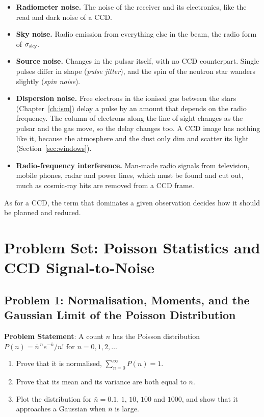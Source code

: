 \begin{itemize}
	\item \textbf{Radiometer noise.} The noise of the receiver and its electronics, like the read and dark noise of a CCD.
	\item \textbf{Sky noise.} Radio emission from everything else in the beam, the radio form of $\sigma_{\rm sky}$.
	\item \textbf{Source noise.} Changes in the pulsar itself, with no CCD counterpart. Single pulses differ in shape (\emph{pulse jitter}), and the spin of the neutron star wanders slightly (\emph{spin noise}).
	\item \textbf{Dispersion noise.} Free electrons in the ionised gas between the stars (Chapter~\ref{ch:ism}) delay a pulse by an amount that depends on the radio frequency. The column of electrons along the line of sight changes as the pulsar and the gas move, so the delay changes too. A CCD image has nothing like it, because the atmosphere and the dust only dim and scatter its light (Section~\ref{sec:windows}).
	\item \textbf{Radio-frequency interference.} Man-made radio signals from television, mobile phones, radar and power lines, which must be found and cut out, much as cosmic-ray hits are removed from a CCD frame.
\end{itemize}
As for a CCD, the term that dominates a given observation decides how it should be planned and reduced.

\section{Problem Set: Poisson Statistics and CCD Signal-to-Noise}

\subsection{Problem 1: Normalisation, Moments, and the Gaussian Limit of the Poisson Distribution}
\label{cc:prob:poisson}

\textbf{Problem Statement}: A count $n$ has the Poisson distribution $P(n)=\bar n^{\,n}e^{-\bar n}/n!$ for $n=0,1,2,\dots$
\begin{enumerate}[label=(\alph*)]
	\item Prove that it is normalised, $\sum_{n=0}^\infty P(n)=1$.
	\item Prove that its mean and its variance are both equal to $\bar n$.
	\item Plot the distribution for $\bar n=0.1$, $1$, $10$, $100$ and $1000$, and show that it approaches a Gaussian when $\bar n$ is large.
\end{enumerate}

